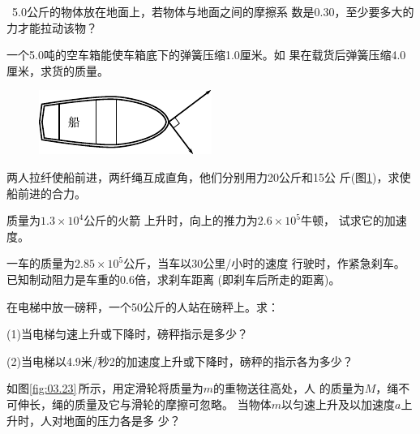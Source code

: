 \begin{exercises}

\exercise ~5.0公斤的物体放在地面上，若物体与地面之间的摩擦系
数是0.30，至少要多大的力才能拉动该物？

\exercise 一个5.0吨的空车箱能使车箱底下的弹簧压缩1.0厘米。如
果在载货后弹簧压缩4.0厘米，求货的质量。

\begin{figure}
	\centering
	\includegraphics{figure/fig03.22}
	\caption{}
	\label{fig:03.22}
\end{figure}
\exercise 两人拉纤使船前进，两纤绳互成直角，他们分别用力20公斤和15公
斤(图\ref{fig:03.22})，求使船前进的合力。

\exercise 质量为$ 1.3 \times 10^4 $公斤的火箭
上升时，向上的推力为$ 2.6 \times 10 ^ { 5 } $牛顿，
试求它的加速度。

\exercise 一车的质量为$ 2.85 \times 10 ^ { 5 } $公斤，当车以30公里/小时的速度
行驶时，作紧急刹车。已知制动阻力是车重的0.6倍，求刹车距离
(即刹车后所走的距离)。

\exercise 在电梯中放一磅秤，一个50公斤的人站在磅秤上。求：

(1)当电梯匀速上升或下降时，磅秤指示是多少？

(2)当电梯以4.9米/秒2的加速度上升或下降时，磅秤的指示各为多少？

\exercise 如图\ref{fig:03.23}\,所示，用定滑轮将质量为$ m $的重物送往高处，人
的质量为$ M $，绳不可伸长，绳的质量及它与滑轮的摩擦可忽略。
当物体$ m $以匀速上升及以加速度$ a $上升时，人对地面的压力各是多
少？


\end{exercises}
